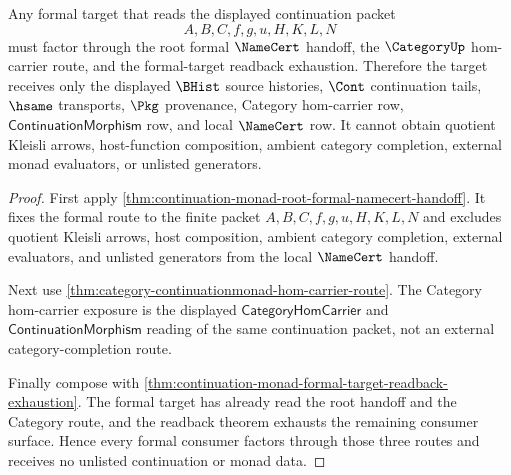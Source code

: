 \begin{theorem}
\label{thm:continuation-monad-formal-route-target-exhaustion}
Any formal target that reads the displayed continuation packet
$$
A,B,C,f,g,u,H,K,L,N
$$
must factor through the root formal $\NameCert$ handoff, the $\CategoryUp$
hom-carrier route, and the formal-target readback exhaustion. Therefore the
target receives only the displayed $\BHist$ source histories, $\Cont$
continuation tails, $\hsame$ transports, $\Pkg$ provenance, Category
hom-carrier row, $\mathsf{ContinuationMorphism}$ row, and local $\NameCert$
row. It cannot obtain quotient Kleisli arrows, host-function composition,
ambient category completion, external monad evaluators, or unlisted
generators.
\end{theorem}
\begin{proof}
First apply
\autoref{thm:continuation-monad-root-formal-namecert-handoff}. It fixes the
formal route to the finite packet $A,B,C,f,g,u,H,K,L,N$ and excludes quotient
Kleisli arrows, host composition, ambient category completion, external
evaluators, and unlisted generators from the local $\NameCert$ handoff.

Next use \autoref{thm:category-continuationmonad-hom-carrier-route}. The
Category hom-carrier exposure is the displayed $\mathsf{CategoryHomCarrier}$
and $\mathsf{ContinuationMorphism}$ reading of the same continuation packet,
not an external category-completion route.

Finally compose with
\autoref{thm:continuation-monad-formal-target-readback-exhaustion}. The
formal target has already read the root handoff and the Category route, and
the readback theorem exhausts the remaining consumer surface. Hence every
formal consumer factors through those three routes and receives no unlisted
continuation or monad data.
\end{proof}

